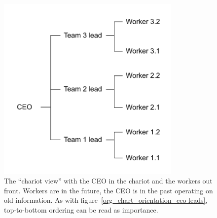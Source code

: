 \begin{figure}
\includegraphics[width=0.8\textwidth]{images/org-chart-orientation-workers-lead.pdf}
\caption{The ``chariot view'' with the CEO in the chariot and the workers out front. Workers are in the future, the CEO is in the past operating on old information. As with figure~\ref{org_chart_orientation_ceo-leads}, top-to-bottom ordering can be read as importance. }
\label{org_chart_orientation_ceo-follows}
\end{figure}



